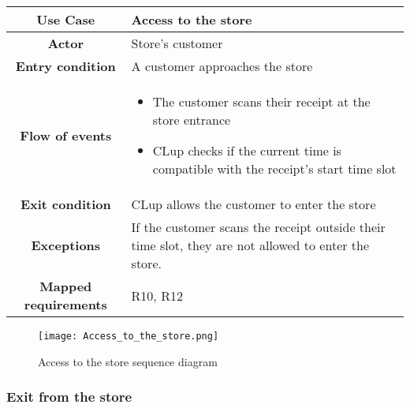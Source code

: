 \documentclass[../../main.tex]{subfiles}
\begin{document}
      \begin{table}[H]
        \centering
          \begin{tabular}{c m{}}
          \hline
          \textbf{Use Case} & Access to the store \\ \hline
          \textbf{Actor} & Store's customer\\ \hline
          \textbf{Entry condition} & A customer approaches the store\\  \hline
          \textbf{Flow of events} & \begin{itemize}
                                      \item The customer scans their receipt at the store entrance
                                      \item CLup checks if the current time is compatible with the receipt's start time slot
                                    \end{itemize}\\ \hline
          \textbf{Exit condition} & CLup allows the customer to enter the store \\ \hline
          \textbf{Exceptions} & If the customer scans the receipt outside their time slot, they are not allowed to enter the store. \\ \hline
          \textbf{Mapped requirements} & R10, R12\\ \hline
          \end{tabular}
      \end{table}

      \begin{figure}[H]
        \centering
        \texttt{[image: Access\_to\_the\_store.png]}
        \caption{Access to the store sequence diagram}
      \end{figure}


      \subsubsection{Exit from the store}
\end{document}
